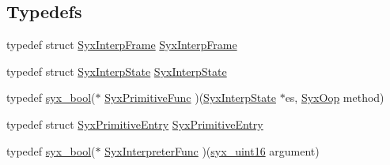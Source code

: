 \subsection*{Typedefs}
\begin{CompactItemize}
\item 
typedef struct \hyperlink{struct_syx_interp_frame}{SyxInterpFrame} \hyperlink{syx-interp_8h_feb9a871de0ca32c4f2ee87a346b1125}{SyxInterpFrame}
\item 
typedef struct \hyperlink{struct_syx_interp_state}{SyxInterpState} \hyperlink{syx-interp_8h_c5d43af3b7df53e03c2abec53c7a25c5}{SyxInterpState}
\item 
typedef \hyperlink{syx-types_8h_c6dc09b276b99fa1956364359139daab}{syx\_\-bool}($\ast$ \hyperlink{syx-interp_8h_3c7eb85b3ff9105a45f6ff8a4efb6462}{SyxPrimitiveFunc} )(\hyperlink{struct_syx_interp_state}{SyxInterpState} $\ast$es, \hyperlink{syx-types_8h_1121caba2d40b2ce090b640762744ccd}{SyxOop} method)
\item 
typedef struct \hyperlink{struct_syx_primitive_entry}{SyxPrimitiveEntry} \hyperlink{syx-interp_8h_b335395931e5fbbf25141d208000a91f}{SyxPrimitiveEntry}
\item 
typedef \hyperlink{syx-types_8h_c6dc09b276b99fa1956364359139daab}{syx\_\-bool}($\ast$ \hyperlink{syx-interp_8h_17bf8fdae73c510d8e75076664ce9e4b}{SyxInterpreterFunc} )(\hyperlink{syx-types_8h_5c0caeeeb45b4575061ab7f368f10337}{syx\_\-uint16} argument)
\end{CompactItemize}
